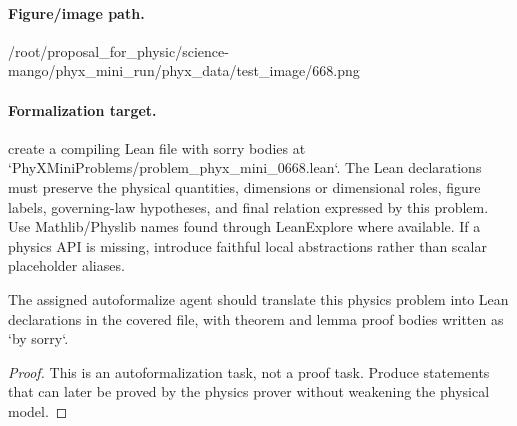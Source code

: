 \paragraph{Figure/image path.}
/root/proposal\_for\_physic/science-mango/phyx\_mini\_run/phyx\_data/test\_image/668.png

\paragraph{Formalization target.}
create a compiling Lean file with sorry bodies at `PhyXMiniProblems/problem\_phyx\_mini\_0668.lean`. The Lean declarations must preserve the physical quantities, dimensions or dimensional roles, figure labels, governing-law hypotheses, and final relation expressed by this problem.
Use Mathlib/Physlib names found through LeanExplore where available. If a physics API is missing, introduce faithful local abstractions rather than scalar placeholder aliases.

\begin{theorem}
\label{thm:physics:phyx_mini_0668:target}
The assigned autoformalize agent should translate this physics problem into Lean declarations in the covered file, with theorem and lemma proof bodies written as `by sorry`.
\end{theorem}
\begin{proof}
This is an autoformalization task, not a proof task. Produce statements that can later be proved by the physics prover without weakening the physical model.
\end{proof}

